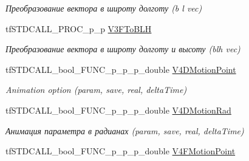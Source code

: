 \begin{DoxyCompactItemize}
\begin{DoxyCompactList}\small\item\em Преобразование вектора в широту долготу (b l vec) \end{DoxyCompactList}\item 
\hypertarget{structs_functions_extension_c_p_u_abf2560986d48a2169ea31d7d2b7deeb5}{tf\-S\-T\-D\-C\-A\-L\-L\-\_\-\-P\-R\-O\-C\-\_\-p\-\_\-p \hyperlink{structs_functions_extension_c_p_u_abf2560986d48a2169ea31d7d2b7deeb5}{V3\-F\-To\-B\-L\-H}}\label{structs_functions_extension_c_p_u_abf2560986d48a2169ea31d7d2b7deeb5}

\begin{DoxyCompactList}\small\item\em Преобразование вектора в широту долготу и высоту (blh vec) \end{DoxyCompactList}\item 
\hypertarget{structs_functions_extension_c_p_u_a0bd63ddceb0aa6176e7c908caa61edec}{tf\-S\-T\-D\-C\-A\-L\-L\-\_\-bool\-\_\-\-F\-U\-N\-C\-\_\-p\-\_\-p\-\_\-p\-\_\-double \hyperlink{structs_functions_extension_c_p_u_a0bd63ddceb0aa6176e7c908caa61edec}{V4\-D\-Motion\-Point}}\label{structs_functions_extension_c_p_u_a0bd63ddceb0aa6176e7c908caa61edec}

\begin{DoxyCompactList}\small\item\em Animation option (param, save, real, delta\-Time) \end{DoxyCompactList}\item 
\hypertarget{structs_functions_extension_c_p_u_a46f3b2dbaa889065919227f9bcfe4afe}{tf\-S\-T\-D\-C\-A\-L\-L\-\_\-bool\-\_\-\-F\-U\-N\-C\-\_\-p\-\_\-p\-\_\-p\-\_\-double \hyperlink{structs_functions_extension_c_p_u_a46f3b2dbaa889065919227f9bcfe4afe}{V4\-D\-Motion\-Rad}}\label{structs_functions_extension_c_p_u_a46f3b2dbaa889065919227f9bcfe4afe}

\begin{DoxyCompactList}\small\item\em Анимация параметра в радианах (param, save, real, delta\-Time) \end{DoxyCompactList}\item 
\hypertarget{structs_functions_extension_c_p_u_a4b67e32ac500e713d68e003772c35167}{tf\-S\-T\-D\-C\-A\-L\-L\-\_\-bool\-\_\-\-F\-U\-N\-C\-\_\-p\-\_\-p\-\_\-p\-\_\-double \hyperlink{structs_functions_extension_c_p_u_a4b67e32ac500e713d68e003772c35167}{V4\-F\-Motion\-Point}}\label{structs_functions_extension_c_p_u_a4b67e32ac500e713d68e003772c35167}


\end{DoxyCompactItemize}
